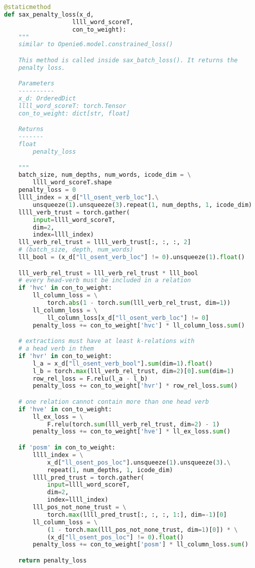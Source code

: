 \documentclass[12pt]{article}
\begin{document}
\begin{lstlisting}[language=Python]
@staticmethod
def sax_penalty_loss(x_d,
                   llll_word_scoreT,
                   con_to_weight):
    """
    similar to Openie6.model.constrained_loss()

    This method is called inside sax_batch_loss(). It returns the
    penalty loss.

    Parameters
    ----------
    x_d: OrderedDict
    llll_word_scoreT: torch.Tensor
    con_to_weight: dict[str, float]

    Returns
    -------
    float
        penalty_loss

    """
    batch_size, num_depths, num_words, icode_dim = \
        llll_word_scoreT.shape
    penalty_loss = 0
    llll_index = x_d["ll_osent_verb_loc"].\
        unsqueeze(1).unsqueeze(3).repeat(1, num_depths, 1, icode_dim)
    llll_verb_trust = torch.gather(
        input=llll_word_scoreT,
        dim=2,
        index=llll_index)
    lll_verb_rel_trust = llll_verb_trust[:, :, :, 2]
    # (batch_size, depth, num_words)
    lll_bool = (x_d["ll_osent_verb_loc"] != 0).unsqueeze(1).float()

    lll_verb_rel_trust = lll_verb_rel_trust * lll_bool
    # every head-verb must be included in a relation
    if 'hvc' in con_to_weight:
        ll_column_loss = \
            torch.abs(1 - torch.sum(lll_verb_rel_trust, dim=1))
        ll_column_loss = \
            ll_column_loss[x_d["ll_osent_verb_loc"] != 0]
        penalty_loss += con_to_weight['hvc'] * ll_column_loss.sum()

    # extractions must have at least k-relations with 
    # a head verb in them
    if 'hvr' in con_to_weight:
        l_a = x_d["ll_osent_verb_bool"].sum(dim=1).float()
        l_b = torch.max(lll_verb_rel_trust, dim=2)[0].sum(dim=1)
        row_rel_loss = F.relu(l_a - l_b)
        penalty_loss += con_to_weight['hvr'] * row_rel_loss.sum()

    # one relation cannot contain more than one head verb
    if 'hve' in con_to_weight:
        ll_ex_loss = \
            F.relu(torch.sum(lll_verb_rel_trust, dim=2) - 1)
        penalty_loss += con_to_weight['hve'] * ll_ex_loss.sum()

    if 'posm' in con_to_weight:
        llll_index = \
            x_d["ll_osent_pos_loc"].unsqueeze(1).unsqueeze(3).\
            repeat(1, num_depths, 1, icode_dim)
        llll_pred_trust = torch.gather(
            input=llll_word_scoreT,
            dim=2,
            index=llll_index)
        lll_pos_not_none_trust = \
            torch.max(llll_pred_trust[:, :, :, 1:], dim=-1)[0]
        ll_column_loss = \
            (1 - torch.max(lll_pos_not_none_trust, dim=1)[0]) * \
            (x_d["ll_osent_pos_loc"] != 0).float()
        penalty_loss += con_to_weight['posm'] * ll_column_loss.sum()

    return penalty_loss
    
\end{lstlisting}
\end{document}

